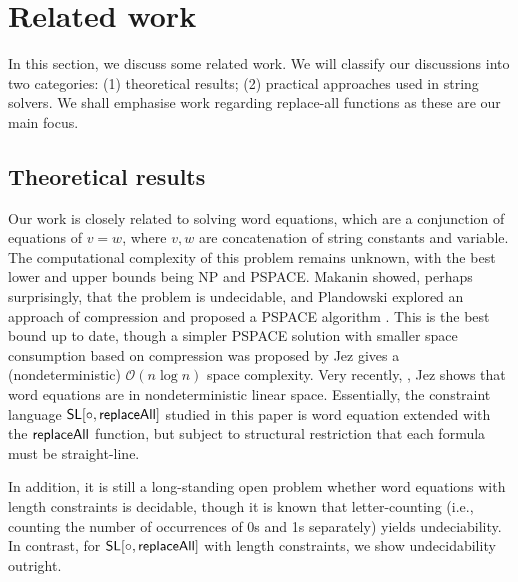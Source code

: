 
\section{Related work}

 
In this section, we discuss some related work. We will classify our discussions into two categories: (1) theoretical results; (2) practical approaches used in string solvers.  We shall emphasise work regarding replace-all functions as these are our main focus. 

\subsection*{Theoretical results}
Our work is closely related to solving word equations, which are a conjunction of equations of $v=w$, where $v, w$ are concatenation of string constants and variable. The computational complexity of this problem remains unknown, with the best lower and upper bounds being NP and PSPACE. Makanin %
showed, perhaps surprisingly, that the problem is undecidable, and %
Plandowski explored an approach of compression and proposed a PSPACE algorithm \cite{P04}.  This is the best bound up to date, though a simpler PSPACE solution with smaller space consumption based on compression was proposed by Jez \cite{J16}  gives a (nondeterministic) $\mathcal{O}(n \log n)$ space complexity. Very recently, \cite{J17}, Jez shows that word equations are in nondeterministic linear space. 
Essentially, the constraint language  $\mathsf{SL}[\circ, \mathsf{replaceAll}]$ studied in this paper is word equation extended with the $\mathsf{replaceAll}$ function, but subject to structural restriction that each formula must be straight-line.  

In addition, it is still a long-standing open problem whether word equations with length constraints is decidable, though it is known that letter-counting (i.e., counting the number of occurrences of 0s and 1s separately) yields undeciability. In contrast, for  $\mathsf{SL}[\circ, \mathsf{replaceAll}]$ with length constraints, we show undecidability outright. 



